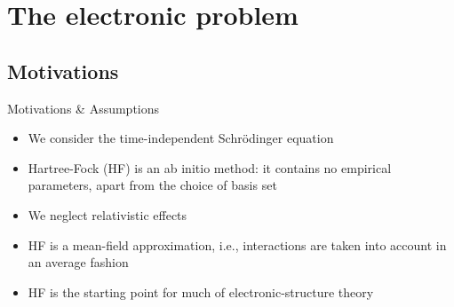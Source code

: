 \documentclass[aspectratio=169,9pt]{beamer}
\begin{document}
\section{The electronic problem}
\subsection{Motivations}
\begin{frame}{Motivations \& Assumptions}
	\begin{itemize}
		\item We consider the \alert{time-independent} Schr\"odinger equation
		\bigskip
		\item Hartree-Fock (HF) is an \alert{ab initio method}: it contains no empirical parameters, apart from the choice of basis set
		\bigskip
		\item We neglect \alert{relativistic effects}
		\bigskip
		\item HF is a \alert{mean-field approximation}, i.e., interactions are taken into account in an average fashion
		\bigskip
		\item \alert{HF is the starting point for much of electronic-structure theory}
	\end{itemize}
\end{frame}

\end{document}
